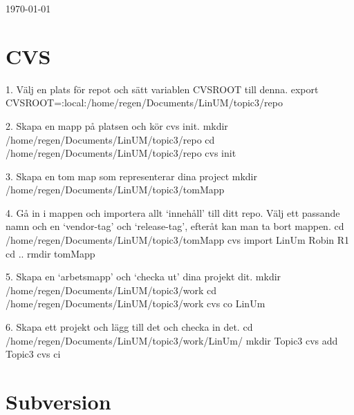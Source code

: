 \documentclass[11pt]{article}
\begin{document}
\begin{titlepage}

	\vfill\vfill\vfill %

	{\large\today} %




	\vfill %

\end{titlepage}


\section{CVS}
1. Välj en plats för repot och sätt variablen CVSROOT till denna.
export CVSROOT=:local:/home/regen/Documents/LinUM/topic3/repo

2. Skapa en mapp på platsen och kör cvs init.
mkdir /home/regen/Documents/LinUM/topic3/repo
cd /home/regen/Documents/LinUM/topic3/repo
cvs init

3. Skapa en tom map som representerar dina project
mkdir /home/regen/Documents/LinUM/topic3/tomMapp

4. Gå in i mappen och importera allt `innehåll' till ditt repo. Välj ett passande namn och en `vendor-tag' och `release-tag', efteråt kan man ta bort mappen.
cd /home/regen/Documents/LinUM/topic3/tomMapp
cvs import LinUm Robin R1
cd ..
rmdir tomMapp

5. Skapa en `arbetsmapp' och `checka ut' dina projekt dit.
mkdir /home/regen/Documents/LinUM/topic3/work
cd /home/regen/Documents/LinUM/topic3/work
cvs co LinUm

6. Skapa ett projekt och lägg till det och checka in det.
cd /home/regen/Documents/LinUM/topic3/work/LinUm/
mkdir Topic3
cvs add Topic3
cvs ci

\section{Subversion}
\lipsum[3]
\end{document}
